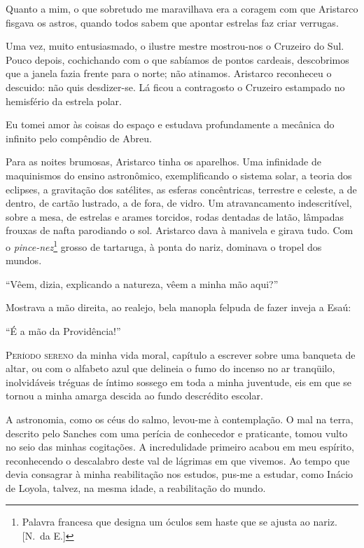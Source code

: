 Quanto a mim, o que sobretudo me maravilhava era a coragem com que Aristarco 
fisgava os astros, quando todos sabem que apontar estrelas faz criar verrugas.
 
Uma vez, muito entusiasmado, o ilustre mestre mostrou{}-nos o Cruzeiro do Sul.
Pouco depois, cochichando com o que sabíamos de pontos cardeais,
descobrimos que a janela fazia frente para o norte; não atinamos.
Aristarco reconheceu o descuido: não quis desdizer{}-se. Lá ficou a
contragosto o Cruzeiro estampado no hemisfério da estrela polar. 

Eu tomei amor às coisas do espaço e estudava profundamente a mecânica do
infinito pelo compêndio de Abreu. 

Para as noites brumosas, Aristarco tinha os aparelhos. Uma infinidade de
maquinismos do ensino astronômico, exemplificando o sistema solar, a teoria dos
eclipses, a gravitação dos satélites, as esferas concêntricas, terrestre e
celeste, a de dentro, de cartão lustrado, a de fora, de vidro. Um atravancamento
indescritível, sobre a mesa, de estrelas e arames torcidos, rodas dentadas de
latão, lâmpadas frouxas de nafta parodiando o sol.  Aristarco dava à manivela e
girava tudo. Com o \textit{pince{}-nez}\footnote{ Palavra francesa que designa um
óculos sem haste que se ajusta ao nariz. [N.~da E.]} grosso de tartaruga, à
ponta do nariz, dominava o tropel dos mundos. 

``Vêem, dizia, explicando a natureza, vêem a minha mão aqui?'' 

Mostrava a mão direita, ao realejo, bela manopla felpuda de fazer inveja a Esaú: 

``É a mão da Providência!''

\sectionitem

\noindent\textsc{Período sereno} da minha vida moral, capítulo a escrever sobre uma
banqueta de altar, ou com o alfabeto azul que delineia o fumo do
incenso no ar tranqüilo, inolvidáveis tréguas de íntimo sossego em toda
a minha juventude, eis em que se tornou a minha amarga descida ao fundo
descrédito escolar. 

A astronomia, como os céus do salmo, levou{}-me à
contemplação. O mal na terra, descrito pelo Sanches com uma perícia de
conhecedor e praticante, tomou vulto no seio das minhas cogitações. A
incredulidade primeiro acabou em meu espírito, reconhecendo o
descalabro deste val de lágrimas em que vivemos. Ao tempo que devia
consagrar à minha reabilitação nos estudos, pus{}-me a estudar, como
Inácio de Loyola, talvez, na mesma idade, a reabilitação do mundo.


